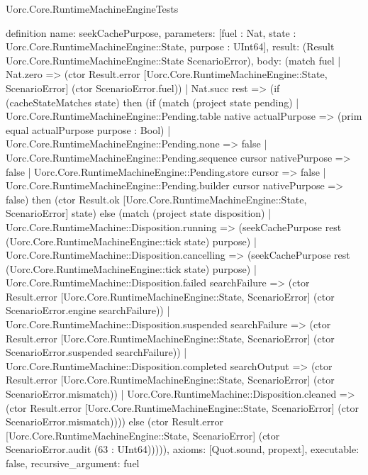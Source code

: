 \begin{lexlean}{Uorc.Core.RuntimeMachineEngineTests}
\begin{semanticmodule}
definition{
  name: seekCachePurpose,
  parameters: [fuel : Nat, state : Uorc.Core.RuntimeMachineEngine::State, purpose : UInt64],
  result: (Result Uorc.Core.RuntimeMachineEngine::State ScenarioError),
  body: (match fuel
    | Nat.zero => (ctor Result.error [Uorc.Core.RuntimeMachineEngine::State, ScenarioError] (ctor ScenarioError.fuel))
    | Nat.succ rest => (if (cacheStateMatches state) then (if (match (project state pending)
      | Uorc.Core.RuntimeMachineEngine::Pending.table native actualPurpose => (prim equal actualPurpose purpose : Bool)
      | Uorc.Core.RuntimeMachineEngine::Pending.none => false
      | Uorc.Core.RuntimeMachineEngine::Pending.sequence cursor nativePurpose => false
      | Uorc.Core.RuntimeMachineEngine::Pending.store cursor => false
      | Uorc.Core.RuntimeMachineEngine::Pending.builder cursor nativePurpose => false) then (ctor Result.ok [Uorc.Core.RuntimeMachineEngine::State, ScenarioError] state) else (match (project state disposition)
      | Uorc.Core.RuntimeMachine::Disposition.running => (seekCachePurpose rest (Uorc.Core.RuntimeMachineEngine::tick state) purpose)
      | Uorc.Core.RuntimeMachine::Disposition.cancelling => (seekCachePurpose rest (Uorc.Core.RuntimeMachineEngine::tick state) purpose)
      | Uorc.Core.RuntimeMachine::Disposition.failed searchFailure => (ctor Result.error [Uorc.Core.RuntimeMachineEngine::State, ScenarioError] (ctor ScenarioError.engine searchFailure))
      | Uorc.Core.RuntimeMachine::Disposition.suspended searchFailure => (ctor Result.error [Uorc.Core.RuntimeMachineEngine::State, ScenarioError] (ctor ScenarioError.suspended searchFailure))
      | Uorc.Core.RuntimeMachine::Disposition.completed searchOutput => (ctor Result.error [Uorc.Core.RuntimeMachineEngine::State, ScenarioError] (ctor ScenarioError.mismatch))
      | Uorc.Core.RuntimeMachine::Disposition.cleaned => (ctor Result.error [Uorc.Core.RuntimeMachineEngine::State, ScenarioError] (ctor ScenarioError.mismatch)))) else (ctor Result.error [Uorc.Core.RuntimeMachineEngine::State, ScenarioError] (ctor ScenarioError.audit (63 : UInt64))))),
  axioms: [Quot.sound, propext],
  executable: false,
  recursive_argument: fuel
}


\end{semanticmodule}
\end{lexlean}
